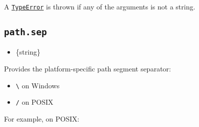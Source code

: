\begin{Shaded}
\begin{Highlighting}[]
\NormalTok{(}\OperatorTok{,} \NormalTok{)}\OperatorTok{;}

\NormalTok{(}\OperatorTok{,} \NormalTok{)}\OperatorTok{;}

\NormalTok{(}\OperatorTok{,} \OperatorTok{,} \NormalTok{)}\OperatorTok{;}
\end{Highlighting}
\end{Shaded}

A \href{errors.md\#class-typeerror}{\texttt{TypeError}} is thrown if any
of the arguments is not a string.

\subsection{\texorpdfstring{\texttt{path.sep}}{path.sep}}\label{path.sep}

\begin{itemize}
\tightlist
\item
  \{string\}
\end{itemize}

Provides the platform-specific path segment separator:

\begin{itemize}
\tightlist
\item
  \texttt{\textbackslash{}} on Windows
\item
  \texttt{/} on POSIX
\end{itemize}

For example, on POSIX:

\begin{Shaded}
\begin{Highlighting}[]
\NormalTok{)}\OperatorTok{;}
\end{Highlighting}
\end{Shaded}

